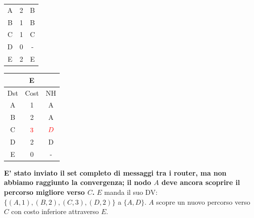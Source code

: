 \documentclass[10pt]{article}
\begin{document}
\begin{table}[h!]
\begin{tabular}{|c||c||c|}
					\hline
					A & 2 & B \\
					B & 1 & B \\
					C & 1 & C \\
					D & 0 & - \\
					E & 2 & E \\
					\hline
				\end{tabular}
				\begin{tabular}{|c||c||c|}
					\hline
					\multicolumn{3}{|c|}{E} \\
					\hline
					Dst & Cost & NH \\
					\hline
					A & 1 & A \\
					B & 2 & A \\
					C & $\color{red} 3$ & $\color{red} D$ \\
					D & 2 & D \\
					E & 0 & - \\
					\hline
				\end{tabular}
			\end{table}
			\newline \newline
			\textbf{E' stato inviato il set completo di messaggi tra i router, ma non abbiamo raggiunto la convergenza; il nodo $A$ deve ancora scoprire il percorso migliore verso $C$.}
			\newline \newline \newline
			$E$ manda il suo DV: $\{(A,1),(B,2),(C,3),(D,2)\}$ a $\{A,D\}$.
			\newline
			$A$ scopre un nuovo percorso verso $C$ con costo inferiore attraverso $E$.
\end{document}

